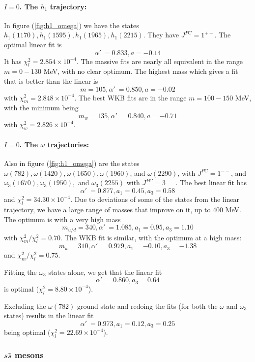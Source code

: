 \documentclass[11pt,a4]{article}
\newcommand{\alp}{\ensuremath{\alpha'\:}}
\newcommand{\ssb}{s\bar{s}}
\newcommand{\rchi}[1]{\ensuremath{\chi^2_m/\chi^2_l = #1}}
\newcommand{\ten}[1]{\times10^{#1}}
\newcommand{\mud}{m_{u/d}}
\begin{document}
				\paragraph{\(I = 0\). The \(h_1\) trajectory:} In figure (\ref{fig:h1_omega}) we have the states \(h_1(1170), h_1(1595), h_1(1965), h_1(2215)\). They have \(J^{PC} = 1^{+-}\). The optimal linear fit is
				\[ \alp = 0.833, a = -0.14 \]
				It has \(\chi^2_l = 2.854\ten{-4}\). The massive fits are nearly all equivalent in the range \(m = 0-130\) MeV, with no clear optimum. The highest mass which gives a fit that is better than the linear is
				\[ m = 105, \alp = 0.850, a = -0.02 \]
				with \(\chi^2_m = 2.848\ten{-4}\). The best WKB fits are in the range \(m = 100-150\) MeV, with the minimum being
				\[ m_w = 135, \alp = 0.840, a = -0.71 \]
				with \(\chi^2_w = 2.826\ten{-4}\).
				
				\paragraph{\(I = 0\). The \(\omega\) trajectories:} Also in figure (\ref{fig:h1_omega}) are the states \(\omega(782), \omega(1420), \omega(1650), \omega(1960)\), and \(\omega(2290)\), with \(J^{PC} = 1^{--}\), and \(\omega_3(1670), \omega_3(1950),\) and \(\omega_3(2255)\) with \(J^{PC} = 3^{--}\).
				The best linear fit has
				\[ \alp = 0.877, a_1 = 0.45, a_3 = 0.58 \]
				and \(\chi^2_l = 34.30\ten{-4}\). Due to deviations of some of the states from the linear trajectory, we have a large range of masses that improve on it, up to \(400\) MeV. The optimum is with a very high mass
				\[ \mud = 340, \alp = 1.085, a_1 = 0.95, a_3 = 1.10 \]
				with \rchi{0.70}. The WKB fit is similar, with the optimum at a high mass:
				\[ m_w = 310, \alp = 0.979, a_1 = -0.10, a_3 = -1.38 \]
				and \rchi{0.75}.
				
				Fitting the \(\omega_3\) states alone, we get that the linear fit
				\[ \alp = 0.860, a_3 = 0.64 \]
				is optimal (\(\chi^2_l = 8.80\ten{-4}\)).
				
				Excluding the \(\omega(782)\) ground state and redoing the fits (for both the \(\omega\) and \(\omega_3\) states) results in the linear fit
				\[ \alp = 0.973, a_1 = 0.12, a_3 = 0.25 \]
				being optimal (\(\chi^2_l = 22.69\ten{-4}\)).
				
			\subsubsection{\texorpdfstring{$\ssb$}{s-sbar} mesons}
\end{document}
